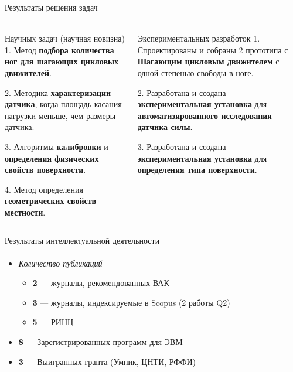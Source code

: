 \documentclass[aspectratio=169,xcolor=table,10pt]{beamer}
\begin{document}
\begin{frame}[t]{Результаты решения задач}
    \framesubtitle{}
    \vspace{-0.7cm}
    \begin{columns}[T,onlytextwidth]
        \begin{column}{0.48\textwidth}
            \begin{block}{Научных задач (научная новизна)}
                1. Метод \textbf{подбора количества ног для шагающих цикловых движителей}.

                2. Методика \textbf{характеризации датчика}, когда площадь касания нагрузки меньше, чем размеры датчика.

                3. Алгоритмы \textbf{калибровки} и \textbf{определения физических свойств поверхности}.

                4. Метод определения \textbf{геометрических свойств местности}.

            \end{block}
        \end{column}
        \begin{column}{0.48\textwidth}
            \begin{alertblock}{Экспериментальных разработок}
                1. Спроектированы и собраны 2 прототипа с \textbf{Шагающим цикловым движителем} с одной степенью свободы в ноге.

                2. Разработана и создана \textbf{экспериментальная установка} для \textbf{автоматизированного исследования датчика силы}.

                3. Разработана и создана \textbf{экспериментальная установка} для \textbf{определения типа поверхности}.

            \end{alertblock}
        \end{column}
    \end{columns}
\end{frame}

\begin{frame}[t]{Результаты интеллектуальной деятельности}
    \framesubtitle{}
    \large
    \begin{itemize}
        \item \textit{Количество публикаций}
              \begin{itemize}
                  \large
                  \item \textbf{2} --- журналы, рекомендованных ВАК
                  \item \textbf{3} --- журналы, индексируемые в Scopus (2 работы Q2)
                  \item \textbf{5} --- РИНЦ
              \end{itemize}
        \item \textbf{8} --- Зарегистрированных программ для ЭВМ
        \item \textbf{3} --- Выигранных гранта (Умник, ЦНТИ, РФФИ)
    \end{itemize}
\end{frame}
\end{document}

